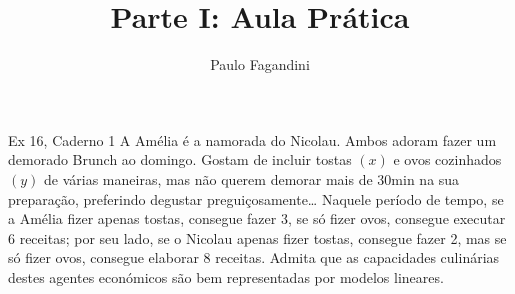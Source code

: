 \documentclass[]{beamer}
\author[P. Fagandini]{Paulo Fagandini}
\title[Parte I]{Parte I: Aula Pr\'atica}
\institute[ISCAL - IPL]{Lisbon Accounting and Business School}
\date{}
\begin{document}
\maketitle

\begin{frame}{Ex 16, Caderno 1}
    A Amélia é a namorada do Nicolau. Ambos adoram fazer um demorado Brunch ao
domingo. Gostam de incluir tostas $(x)$ e ovos cozinhados $(y)$ de várias maneiras, mas não
querem demorar mais de 30min na sua preparação, preferindo degustar
preguiçosamente… Naquele período de tempo, se a Amélia fizer apenas tostas,
consegue fazer 3, se só fizer ovos, consegue executar 6 receitas; por seu lado, se o
Nicolau apenas fizer tostas, consegue fazer 2, mas se só fizer ovos, consegue elaborar 8
receitas. Admita que as capacidades culinárias destes agentes económicos são bem
representadas por modelos lineares.

\end{frame}
\end{document}
